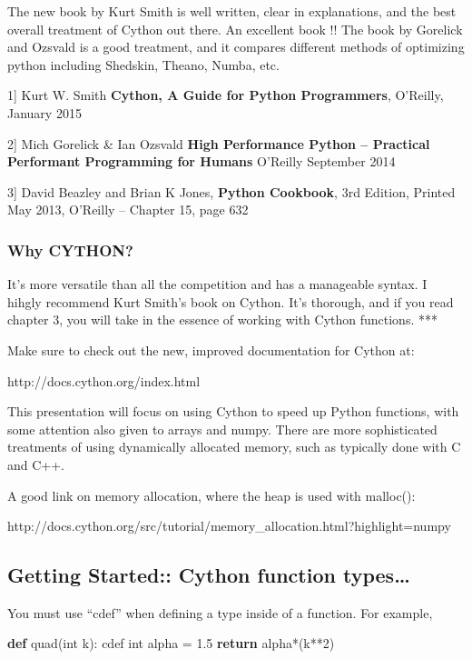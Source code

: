 \documentclass{article}
\newenvironment{Shaded}{}{}
\newcommand{\KeywordTok}[1]{\textcolor[rgb]{0.00,0.44,0.13}{\textbf{{#1}}}}
\newcommand{\DataTypeTok}[1]{\textcolor[rgb]{0.56,0.13,0.00}{{#1}}}
\newcommand{\DecValTok}[1]{\textcolor[rgb]{0.25,0.63,0.44}{{#1}}}
\newcommand{\FloatTok}[1]{\textcolor[rgb]{0.25,0.63,0.44}{{#1}}}
\newcommand{\NormalTok}[1]{{#1}}
\begin{document}
The new book by Kurt Smith is well written, clear in explanations, and
the best overall treatment of Cython out there. An excellent book !! The
book by Gorelick and Ozsvald is a good treatment, and it compares
different methods of optimizing python including Shedskin, Theano,
Numba, etc.

1{]} Kurt W. Smith \textbf{Cython, A Guide for Python Programmers},
O'Reilly, January 2015

2{]} Mich Gorelick \& Ian Ozsvald \textbf{High Performance Python --
Practical Performant Programming for Humans} O'Reilly September 2014

3{]} David Beazley and Brian K Jones, \textbf{Python Cookbook}, 3rd
Edition, Printed May 2013, O'Reilly -- Chapter 15, page 632

    \subsubsection{Why CYTHON?}\label{why-cython}

It's more versatile than all the competition and has a manageable
syntax. I hihgly recommend Kurt Smith's book on Cython. It's thorough,
and if you read chapter 3, you will take in the essence of working with
Cython functions. ***

Make sure to check out the new, improved documentation for Cython at:

http://docs.cython.org/index.html

This presentation will focus on using Cython to speed up Python
functions, with some attention also given to arrays and numpy. There are
more sophisticated treatments of using dynamically allocated memory,
such as typically done with C and C++.

A good link on memory allocation, where the heap is used with malloc():

http://docs.cython.org/src/tutorial/memory\_allocation.html?highlight=numpy

    \subsection{Getting Started:: Cython function
types\ldots{}}\label{getting-started-cython-function-types}

You must use ``cdef'' when defining a type inside of a function. For
example,

\begin{Shaded}
\begin{Highlighting}[]
\KeywordTok{def} \NormalTok{quad(}\DataTypeTok{int} \NormalTok{k):}
    \NormalTok{cdef }\DataTypeTok{int} \NormalTok{alpha = }\FloatTok{1.5}
    \KeywordTok{return} \NormalTok{alpha*(k**}\DecValTok{2}\NormalTok{)}
\end{Highlighting}
\end{Shaded}
\end{document}
